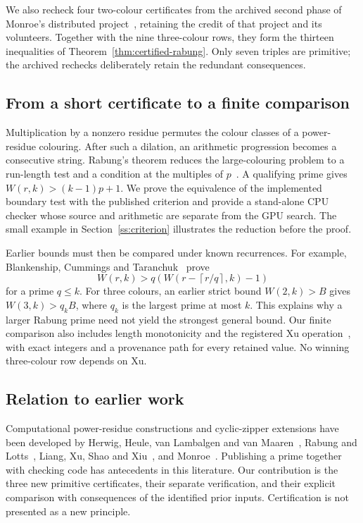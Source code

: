 We also recheck four two-colour certificates from the archived second phase of
Monroe's distributed project~\cite{MonroePhase2Archive}, retaining the credit
of that project and its volunteers. Together with the nine three-colour rows,
they form the thirteen inequalities of Theorem~\ref{thm:certified-rabung}.
Only seven triples are primitive; the archived rechecks deliberately retain
the redundant consequences.

\subsection{From a short certificate to a finite comparison}

Multiplication by a nonzero residue permutes the colour classes of a
power-residue colouring. After such a dilation, an arithmetic progression
becomes a consecutive string. Rabung's theorem reduces the large-colouring
problem to a run-length test and a condition at the multiples of
$p$~\cite{rabung1979}. A qualifying prime gives $W(r,k)>(k-1)p+1$.
We prove the equivalence of the implemented boundary test with the published
criterion and provide a stand-alone CPU checker whose source and arithmetic
are separate from the GPU search. The small example in
Section~\ref{ss:criterion} illustrates the reduction before the proof.



Earlier bounds must then be compared under known recurrences. For example,
Blankenship, Cummings and Taranchuk~\cite[Theorem~2.1]{bct2018} prove
\begin{equation}\label{eq:bct-intro}
 W(r,k)>q\left(W\!\left(r-\left\lceil r/q\right\rceil,k\right)-1\right)
\end{equation}
for a prime $q\le k$. For three colours, an earlier strict bound
$W(2,k)>B$ gives $W(3,k)>q_kB$, where $q_k$ is the largest prime at most
$k$. This explains why a larger Rabung prime need not yield the strongest
general bound. Our finite comparison also includes length monotonicity and
the registered Xu operation~\cite{xu2013,Monroe2026}, with exact integers
and a provenance path for every retained value. No winning three-colour row
depends on Xu.

\subsection{Relation to earlier work}

Computational power-residue constructions and cyclic-zipper extensions have
been developed by Herwig, Heule, van Lambalgen and van Maaren~\cite{herwig2007},
Rabung and Lotts~\cite{rabunglotts2012}, Liang, Xu, Shao and
Xiu~\cite{liang2012}, and Monroe~\cite{Monroe2016v1,Monroe2017v4,Monroe2026}.
Publishing a prime together with checking code has antecedents in this
literature. Our contribution is the three new primitive certificates, their
separate verification, and their explicit comparison with consequences of
the identified prior inputs. Certification is not presented as a new principle.

